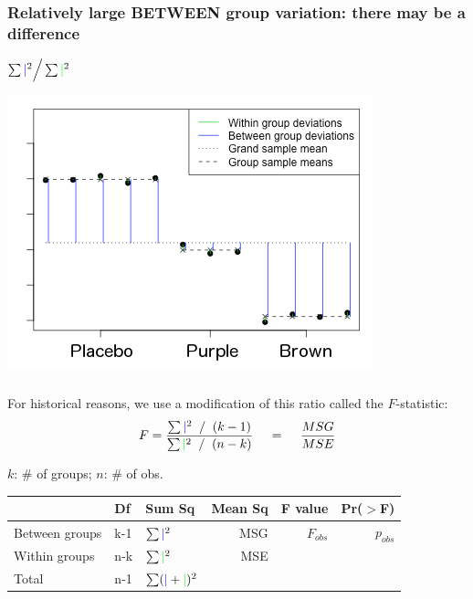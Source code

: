 \documentclass[11pt,containsverbatim,handout,xcolor=xelatex,dvipsnames,table]{beamer}
\begin{document}
\begin{frame}
\frametitle{Relatively large BETWEEN group variation: there may be a difference}

\centering
\(
\sum {\color{blue} \mid}^2 \Big/ \sum {\color{green} \mid}^2
\)
    
    \includegraphics[scale=0.6]{Figures/anova-lots-of-between-group-jelly-bean.png}

\end{frame}


\begin{frame}
  \frametitle{}

For historical reasons, we use a modification of this ratio called the $F$-statistic:
\[
F = \frac{\sum {\color{blue} \mid}^2 \; \; / \; \; (k - 1)}{\sum {\color{green} \mid}^2 \; \; / \; \; (n - k)}
\hspace{12pt} = \hspace{12pt} \frac{MSG}{MSE}
\]

$k$: \# of groups; $n$: \# of obs.

\pause

\begin{center}
\small
\begin{tabular}{lllrrr}
  \hline
  & Df  & Sum Sq & Mean Sq & F value & Pr($>$F) \\ 
  \hline
  Between groups & k-1 & $\sum {\color{blue}\mid}^2$  & MSG & $F_{obs}$ & $p_{obs}$ \\ 
  Within groups & n-k & $\sum {\color{green}\mid}^2$ & MSE &		 &  \\ 
   \hline
Total			& n-1 & $\sum ({\color{blue}\mid} + {\color{green}\mid})^2$    &                &                &
\end{tabular}
\end{center}

\end{frame}
\end{document}

